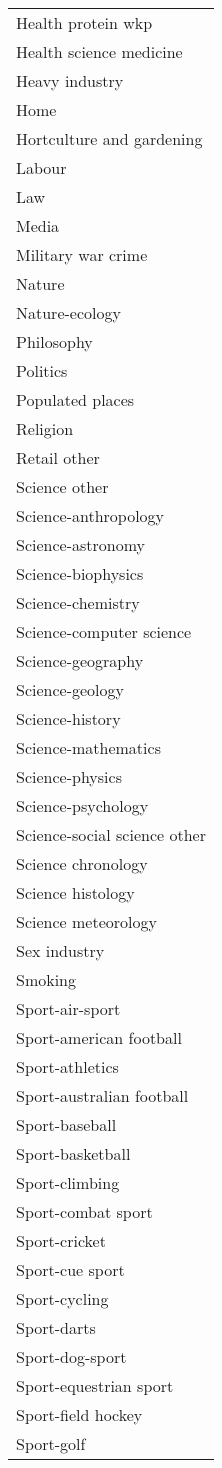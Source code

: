 \documentclass[letterpaper]{article}
\begin{document}
\begin{table*}[ht]
\caption{Human Type Axis: Topic (continued)}
\begin{center}
\begin{tabular}{|l|}\hline
Health protein wkp\\
Health science medicine\\
Heavy industry\\
Home\\
Hortculture and gardening\\
Labour\\
Law\\
Media\\
Military war crime\\
Nature\\
Nature-ecology\\
Philosophy\\
Politics\\
Populated places\\
Religion\\
Retail other\\
Science other\\
Science-anthropology\\
Science-astronomy\\
Science-biophysics\\
Science-chemistry\\
Science-computer science\\
Science-geography\\
Science-geology\\
Science-history\\
Science-mathematics\\
Science-physics\\
Science-psychology\\
Science-social science other\\
Science chronology\\
Science histology\\
Science meteorology\\
Sex industry\\
Smoking\\
Sport-air-sport\\
Sport-american football\\
Sport-athletics\\
Sport-australian football\\
Sport-baseball\\
Sport-basketball\\
Sport-climbing\\
Sport-combat sport\\
Sport-cricket\\
Sport-cue sport\\
Sport-cycling\\
Sport-darts\\
Sport-dog-sport\\
Sport-equestrian sport\\
Sport-field hockey\\
Sport-golf\\
\hline
\end{tabular}
\end{center}
\label{table:}
\end{table*}\begin{table*}[ht]


\end{table*}
\end{document}
